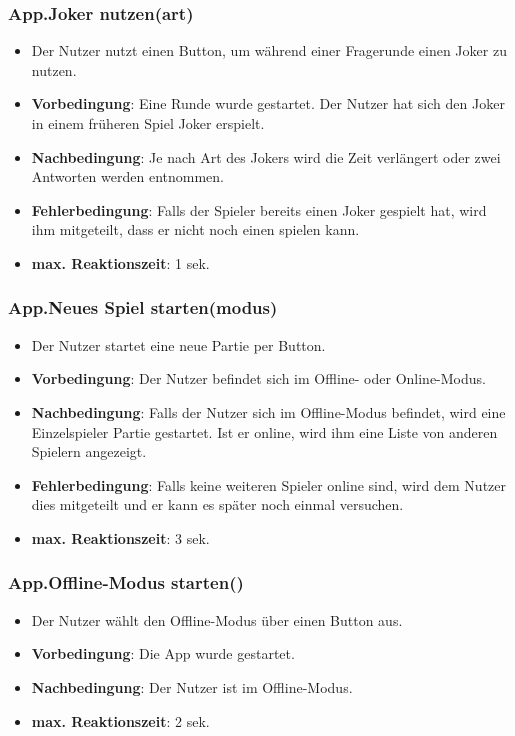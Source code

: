 \documentclass[fontsize=12pt,paper=a4,twoside]{scrartcl}
\begin{document}
\subsubsection{App.Joker nutzen(art)}
\begin{itemize}
\item Der Nutzer nutzt einen Button, um während einer Fragerunde einen Joker zu nutzen.
\item \textbf{Vorbedingung}: Eine Runde wurde gestartet. Der Nutzer hat sich den Joker in einem früheren Spiel Joker erspielt.
\item \textbf{Nachbedingung}: Je nach Art des Jokers wird die Zeit verlängert oder zwei Antworten werden entnommen. 
\item \textbf{Fehlerbedingung}: Falls der Spieler bereits einen Joker gespielt hat, wird ihm mitgeteilt, dass er nicht noch einen spielen kann.
\item \textbf{max. Reaktionszeit}: 1 sek.
\end{itemize}

\subsubsection{App.Neues Spiel starten(modus)}
\begin{itemize}
\item Der Nutzer startet eine neue Partie per Button.
\item \textbf{Vorbedingung}: Der Nutzer befindet sich im Offline- oder Online-Modus.
\item \textbf{Nachbedingung}: Falls der Nutzer sich im Offline-Modus befindet, wird eine Einzelspieler Partie gestartet. Ist er online, wird ihm eine Liste von anderen Spielern angezeigt.
\item \textbf{Fehlerbedingung}: Falls keine weiteren Spieler online sind, wird dem Nutzer dies mitgeteilt und er kann es später noch einmal versuchen.
\item \textbf{max. Reaktionszeit}: 3 sek.
\end{itemize}

\subsubsection{App.Offline-Modus starten()}
\begin{itemize}
\item Der Nutzer wählt den Offline-Modus über einen Button aus.
\item \textbf{Vorbedingung}: Die App wurde gestartet.
\item \textbf{Nachbedingung}: Der Nutzer ist im Offline-Modus.
\item \textbf{max. Reaktionszeit}: 2 sek.
\end{itemize}
\end{document}
